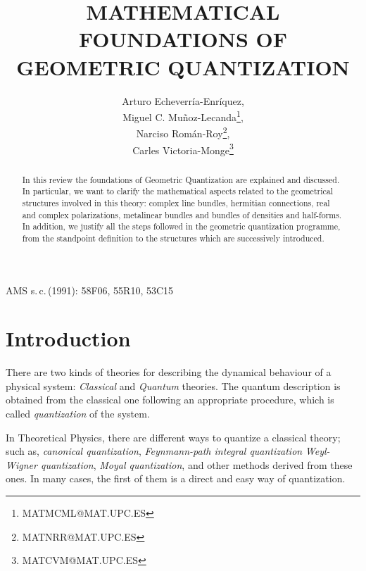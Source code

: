 \documentclass[12pt]{article}
\title{MATHEMATICAL FOUNDATIONS OF GEOMETRIC QUANTIZATION}
\author{\sc Arturo Echeverr\'ia-Enr\'iquez,
   \\
   {\sc Miguel C. Mu\~noz-Lecanda\thanks{MATMCML@MAT.UPC.ES}},
   \\
   {\sc Narciso Rom\'an-Roy\thanks{MATNRR@MAT.UPC.ES}},
   \\
   {\sc Carles Victoria-Monge\thanks{MATCVM@MAT.UPC.ES}}
   \\
   \tabaddress{\UPCMAT}}
\date{ }
\theoremstyle{plain}
\begin{document}
\maketitle


\begin{abstract}
In this review
the foundations of Geometric Quantization are explained and discussed.
In particular, we want to clarify the mathematical aspects related to
the
geometrical structures involved in this theory: complex line bundles,
hermitian connections, real and complex polarizations, metalinear
bundles and
bundles of densities and half-forms.
In addition, we justify all the steps followed in the geometric
quantization programme,
 from the standpoint definition to the structures which are successively
introduced.
\end{abstract}


\vfill \hfill
\vbox{\raggedleft AMS s.\,c.\,(1991): 58F06, 55R10, 53C15}\null

\thispagestyle{empty}
\setcounter{page}{0}


\clearpage
\tableofcontents


\newpage

\section{Introduction}


There are two kinds of theories for describing
the dynamical behaviour of a physical system:
{\it Classical} and {\it Quantum} theories.
The quantum description is obtained from the classical one
following an appropriate procedure, which is called {\it quantization}
of the system.

In Theoretical Physics, there are different ways to quantize a classical
theory;
such as,  {\it canonical quantization}, {\it Feynmann-path integral
quantization}
{\it Weyl-Wigner quantization}, {\it Moyal quantization},
and other methods derived from these ones.
In many cases, the first of them is a direct and easy way of
quantization.
\end{document}
